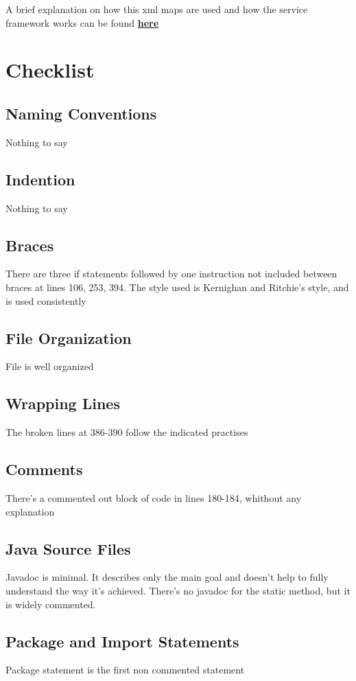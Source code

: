 \documentclass{article}
\begin{document}
A brief explanation on how this xml maps are used and how the service framework works can be found \href{https://cwiki.apache.org/confluence/display/OFBIZ/Service+Engine+Guide#ServiceEngineGuide-serviceDefinition}{\textbf{here}}



\section{Checklist}
\subsection{Naming Conventions}
Nothing to say
\subsection{Indention}
Nothing to say
\subsection{Braces}
There are three if statements followed by one instruction not included between braces at lines 106, 253, 394. The style used is Kernighan and Ritchie's style, and is used consistently
\subsection{File Organization}
File is well organized
\subsection{Wrapping Lines}
The broken lines at 386-390 follow the indicated practises
\subsection{Comments}
There's a commented out block of code in lines 180-184, whithout any explanation

\subsection{Java Source Files}
Javadoc is minimal. It describes only the main goal and doesn't help to fully understand the way it's achieved. There's no javadoc for the static method, but it is widely commented.

\subsection{Package and Import Statements}
Package statement is the first non commented statement
\end{document}
